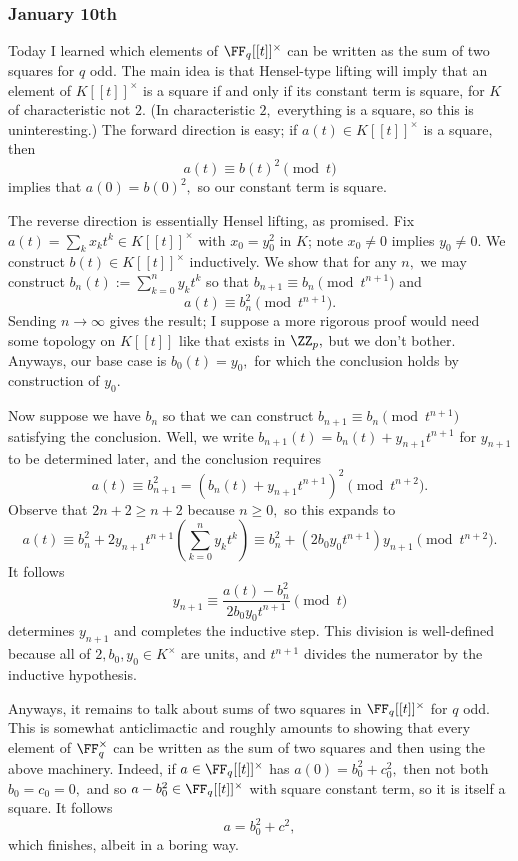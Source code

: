 \subsubsection{January 10th}
Today I learned which elements of $\FF_q[[t]]^\times$ can be written as the sum of two squares for $q$ odd. The main idea is that Hensel-type lifting will imply that an element of $K[[t]]^\times$ is a square if and only if its constant term is square, for $K$ of characteristic not $2.$ (In characteristic $2,$ everything is a square, so this is uninteresting.) The forward direction is easy; if $a(t)\in K[[t]]^\times$ is a square, then
\[a(t)\equiv b(t)^2\pmod t\]
implies that $a(0)=b(0)^2,$ so our constant term is square.

The reverse direction is essentially Hensel lifting, as promised. Fix $a(t)=\sum_kx_kt^k\in K[[t]]^\times$ with $x_0=y_0^2$ in $K$; note $x_0\ne0$ implies $y_0\ne0.$ We construct $b(t)\in K[[t]]^\times$ inductively. We show that for any $n,$ we may construct $b_n(t):=\sum_{k=0}^ny_kt^k$ so that $b_{n+1}\equiv b_n\pmod{t^{n+1}}$ and
\[a(t)\equiv b_n^2\pmod{t^{n+1}}.\]
Sending $n\to\infty$ gives the result; I suppose a more rigorous proof would need some topology on $K[[t]]$ like that exists in $\ZZ_p,$ but we don't bother. Anyways, our base case is $b_0(t)=y_0,$ for which the conclusion holds by construction of $y_0.$

Now suppose we have $b_n$ so that we can construct $b_{n+1}\equiv b_n\pmod{t^{n+1}}$ satisfying the conclusion. Well, we write $b_{n+1}(t)=b_n(t)+y_{n+1}t^{n+1}$ for $y_{n+1}$ to be determined later, and the conclusion requires
\[a(t)\equiv b_{n+1}^2=\left(b_n(t)+y_{n+1}t^{n+1}\right)^2\pmod{t^{n+2}}.\]
Observe that $2n+2\ge n+2$ because $n\ge0,$ so this expands to
\[a(t)\equiv b_n^2+2y_{n+1}t^{n+1}\left(\sum_{k=0}^ny_kt^k\right)\equiv b_n^2+\left(2b_0y_0t^{n+1}\right)y_{n+1}\pmod{t^{n+2}}.\]
It follows
\[y_{n+1}\equiv\frac{a(t)-b_n^2}{2b_0y_0t^{n+1}}\pmod t\]
determines $y_{n+1}$ and completes the inductive step. This division is well-defined because all of $2,b_0,y_0\in K^\times$ are units, and $t^{n+1}$ divides the numerator by the inductive hypothesis.

Anyways, it remains to talk about sums of two squares in $\FF_q[[t]]^\times$ for $q$ odd. This is somewhat anticlimactic and roughly amounts to showing that every element of $\FF_q^\times$ can be written as the sum of two squares and then using the above machinery. Indeed, if $a\in \FF_q[[t]]^\times$ has $a(0)=b_0^2+c_0^2,$ then not both $b_0=c_0=0,$ and so $a-b_0^2\in\FF_q[[t]]^\times$ with square constant term, so it is itself a square. It follows
\[a=b_0^2+c^2,\]
which finishes, albeit in a boring way.

